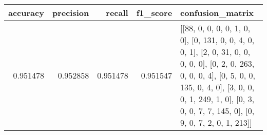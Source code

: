 \begin{tabular}{rrrrl}
\toprule
accuracy & precision & recall & f1_score & confusion_matrix \\
\midrule
0.951478 & 0.952858 & 0.951478 & 0.951547 & [[88, 0, 0, 0, 0, 1, 0, 0], [0, 131, 0, 0, 4, 0, 0, 1], [2, 0, 31, 0, 0, 0, 0, 0], [0, 2, 0, 263, 0, 0, 0, 4], [0, 5, 0, 0, 135, 0, 4, 0], [3, 0, 0, 0, 1, 249, 1, 0], [0, 3, 0, 0, 7, 7, 145, 0], [0, 9, 0, 7, 2, 0, 1, 213]] \\
\bottomrule
\end{tabular}
